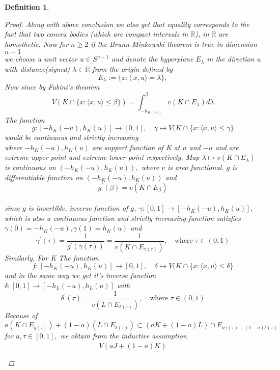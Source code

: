 \documentclass[oneside]{book}
\newtheorem{mydef}{Definition}
\begin{document}
\begin{mydef}
\begin{proof}
\hfill \break 
Along with above conclusion we also get that equality corresponds to the fact that two convex bodies (which are compact intervals in $\mathbb{R}$), in $\mathbb{R}$  are homothetic.
\hfill \break 
Now for $n \geq 2$ if the Brunn-Minkowski theorem is true in dimension $n-1 $
\\
we choose a unit vector $u \in S^{n-1}$ and denote 
the hyperplane $E_{\lambda}$ in the direction $u$ with  distance(signed) $\lambda \in \mathbb{R} $ from the origin defined by 
\[
E_{\lambda}:=\{x:\langle\ x, u\rangle=\lambda\}, 
\]
Now since by Fubini's theorem  
\[
V(K \cap\{x: \langle x, u\rangle \leq \beta\}) = \int_{-h_{ K(-u)}}^{\beta} v\left(K \cap E_{\lambda}\right) d \lambda
\] 
The function
\[
g:\left[-h_{K}(-u), h_{K}(u)\right] \rightarrow[0,1], \quad \gamma \mapsto V(K \cap\{x:\langle x, u\rangle \leq  \gamma \}
\]
would be  continuous and strictly increasing\\
where $-h_{K}(-u), h_{K}(u)$ are support function of K at $u$ and $-u$ and are extreme upper point and extreme lower point respectively.
\hfill \break
  Map $\lambda \mapsto v\left(K \cap E_{\lambda}\right)$ is continuous on $\left(-h_{K}(-u), h_{K}(u)\right),$ where $v$ is area functional.
   $g$ is differentiable function on $\left(-h_{K}(-u), h_{K}(u)\right)$ and $$g^{\prime}(\beta)=v\left(K \cap E_{\beta}\right)$$
  \\
  since $g$ is invertible, inverse function of $g$, $ \gamma:[0,1] \rightarrow\left[-h_{K}(-u), h_{K}(u)\right],$ which is also a continuous function and strictly increasing  function satisfies $ \gamma(0)=-h_{K}(-u),  \gamma(1)=h_{K}(u)$ and
\[
 \gamma^{\prime}(\tau)=\frac{1}{g^{\prime}( \gamma(\tau))}=\frac{1}{v\left(K \cap E_{ \gamma(\tau)}\right)}, \quad  \text{where } \tau \in(0,1)
\]
Similarly, For K
The function
\[
f:\left[-h_{K}(-u), h_{K}(u)\right] \rightarrow[0,1], \quad \delta \mapsto V(K \cap\{x:\langle x, u\rangle \leq  \delta \}
\]
and in the same way
we get it's inverse function $ \delta:[0,1] \rightarrow\left[-h_{L}(-u), h_{L}(u)\right]$     with 
\[
\delta^{\prime}(\tau)=\frac{1}{v\left(L \cap E_{\delta(\tau)}\right)}, \quad  \text{where } \tau \in(0,1)
\]
Because of
\[
a\left(K \cap E_{g(\tau)}\right)+(1-a)\left(L \cap E_{\delta(\tau)}\right) \subset(a K+(1-a) L) \cap E_{a \gamma(\tau)+(1-a) \delta(\tau)}
\]
for $a, \tau \in[0,1],$ we obtain from the inductive assumption
\[
\begin{array}{l}
V(a J+(1-a) K) \\\\

\end{array}\]
\end{proof}
\end{mydef}
\end{document}
